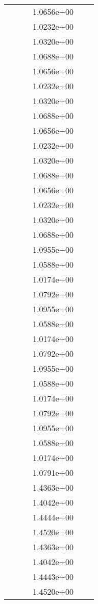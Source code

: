 \begin{xltabular}{\textwidth}{r|rS[table-format=1.3e+2]S[table-format=1.4e+2]S[table-format=1.4e+2]S[table-format=-1.5]}
&  &  & 1.0656e+00 & & \\
&  &  & 1.0232e+00 & & \\
&  &  & 1.0320e+00 & & \\
&  &  & 1.0688e+00 & & \\
&  &  & 1.0656e+00 & & \\
&  &  & 1.0232e+00 & & \\
&  &  & 1.0320e+00 & & \\
&  &  & 1.0688e+00 & & \\
&  &  & 1.0656e+00 & & \\
&  &  & 1.0232e+00 & & \\
&  &  & 1.0320e+00 & & \\
&  &  & 1.0688e+00 & & \\
&  &  & 1.0656e+00 & & \\
&  &  & 1.0232e+00 & & \\
&  &  & 1.0320e+00 & & \\
&  &  & 1.0688e+00 & & \\
&  &  & 1.0955e+00 & & \\
&  &  & 1.0588e+00 & & \\
&  &  & 1.0174e+00 & & \\
&  &  & 1.0792e+00 & & \\
&  &  & 1.0955e+00 & & \\
&  &  & 1.0588e+00 & & \\
&  &  & 1.0174e+00 & & \\
&  &  & 1.0792e+00 & & \\
&  &  & 1.0955e+00 & & \\
&  &  & 1.0588e+00 & & \\
&  &  & 1.0174e+00 & & \\
&  &  & 1.0792e+00 & & \\
&  &  & 1.0955e+00 & & \\
&  &  & 1.0588e+00 & & \\
&  &  & 1.0174e+00 & & \\
&  &  & 1.0791e+00 & & \\
&  &  & 1.4363e+00 & & \\
&  &  & 1.4042e+00 & & \\
&  &  & 1.4444e+00 & & \\
&  &  & 1.4520e+00 & & \\
&  &  & 1.4363e+00 & & \\
&  &  & 1.4042e+00 & & \\
&  &  & 1.4443e+00 & & \\
&  &  & 1.4520e+00 & & \\

\end{xltabular}
